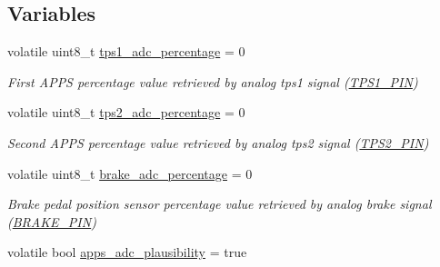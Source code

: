 \subsection*{Variables}
\begin{DoxyCompactItemize}
\item 
\mbox{\label{group___board__model__group_ga7c7f5690cca986bc3fb2f6dcbda24690}} 
volatile uint8\+\_\+t \mbox{\hyperlink{group___board__model__group_ga7c7f5690cca986bc3fb2f6dcbda24690}{tps1\+\_\+adc\+\_\+percentage}} = 0
\begin{DoxyCompactList}\small\item\em First A\+P\+PS percentage value retrieved by analog tps1 signal (\mbox{\hyperlink{group___board__model__group_gae9aa914854f611488701c96a330b0bd4}{T\+P\+S1\+\_\+\+P\+IN}}) \end{DoxyCompactList}\item 
\mbox{\label{group___board__model__group_gae1f465253d690605c0948394a3f055f4}} 
volatile uint8\+\_\+t \mbox{\hyperlink{group___board__model__group_gae1f465253d690605c0948394a3f055f4}{tps2\+\_\+adc\+\_\+percentage}} = 0
\begin{DoxyCompactList}\small\item\em Second A\+P\+PS percentage value retrieved by analog tps2 signal (\mbox{\hyperlink{group___board__model__group_gab13a816bae3ca994897fc6f1cb590a67}{T\+P\+S2\+\_\+\+P\+IN}}) \end{DoxyCompactList}\item 
\mbox{\label{group___board__model__group_ga709add26e40f60e3add32981ea2a5868}} 
volatile uint8\+\_\+t \mbox{\hyperlink{group___board__model__group_ga709add26e40f60e3add32981ea2a5868}{brake\+\_\+adc\+\_\+percentage}} = 0
\begin{DoxyCompactList}\small\item\em Brake pedal position sensor percentage value retrieved by analog brake signal (\mbox{\hyperlink{group___board__model__group_gad632b56bf4c6259a390c3db91607078e}{B\+R\+A\+K\+E\+\_\+\+P\+IN}}) \end{DoxyCompactList}\item 
\mbox{\label{group___board__model__group_ga3e919d1e6477d52b4ccddd497351d3ec}} 
volatile bool \mbox{\hyperlink{group___board__model__group_ga3e919d1e6477d52b4ccddd497351d3ec}{apps\+\_\+adc\+\_\+plausibility}} = true

\end{DoxyCompactItemize}
